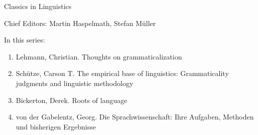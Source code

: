 {\large Classics in Linguistics}

\bigskip

Chief Editors: Martin Haspelmath, Stefan Müller

\bigskip

In this series:

\begin{enumerate}
\item Lehmann, Christian. Thoughts on grammaticalization
\item Schütze, Carson T. The empirical base of linguistics: Grammaticality judgments and linguistic methodology
\item Bickerton, Derek. Roots of language
\item von der Gabelentz, Georg. Die Sprachwissenschaft: Ihre Aufgaben, Methoden und bisherigen Ergebnisse
\end{enumerate}


\vfill

